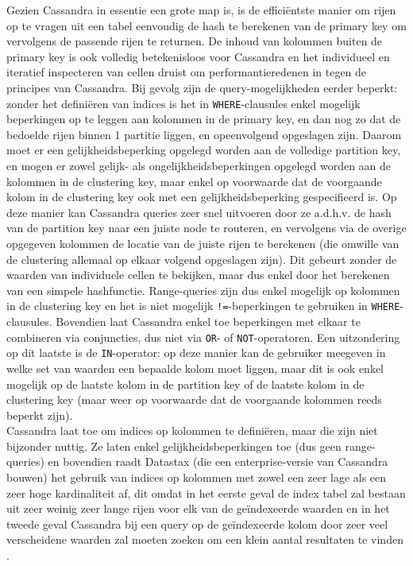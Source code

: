 Gezien Cassandra in essentie een grote map is, is de effici\"entste manier om rijen op te vragen uit een tabel eenvoudig de hash te berekenen van de primary key om vervolgens de passende rijen te returnen. De inhoud van kolommen buiten de primary key is ook volledig betekenisloos voor Cassandra en het individueel en iteratief inspecteren van cellen druist om performantieredenen in tegen de principes van Cassandra. Bij gevolg zijn de query-mogelijkheden eerder beperkt: zonder het defini\"eren van indices is het in \texttt{WHERE}-clausules enkel mogelijk beperkingen op te leggen aan kolommen in de primary key, en dan nog zo dat de bedoelde rijen binnen 1 partitie liggen, en opeenvolgend opgeslagen zijn. Daarom moet er een gelijkheidsbeperking opgelegd worden aan de volledige partition key, en mogen er zowel gelijk- als ongelijkheidsbeperkingen opgelegd worden aan de kolommen in de clustering key, maar enkel op voorwaarde dat de voorgaande kolom in de clustering key ook met een gelijkheidsbeperking gespecifieerd is. Op deze manier kan Cassandra queries zeer snel uitvoeren door ze a.d.h.v. de hash van de partition key naar een juiste node te routeren, en vervolgens via de overige opgegeven kolommen de locatie van de juiste rijen te berekenen (die omwille van de clustering allemaal op elkaar volgend opgeslagen zijn). Dit gebeurt zonder de waarden van individuele cellen te bekijken, maar dus enkel door het berekenen van een simpele hashfunctie. Range-queries zijn dus enkel mogelijk op kolommen in de clustering key en het is niet mogelijk \texttt{!=}-beperkingen te gebruiken in \texttt{WHERE}-clausules. Bovendien laat Cassandra enkel toe beperkingen met elkaar te combineren via conjuncties, dus niet via \texttt{OR}- of \texttt{NOT}-operatoren. Een uitzondering op dit laatste is de \texttt{IN}-operator: op deze manier kan de gebruiker meegeven in welke set van waarden een bepaalde kolom moet liggen, maar dit is ook enkel mogelijk op de laatste kolom in de partition key of de laatste kolom in de clustering key (maar weer op voorwaarde dat de voorgaande kolommen reeds beperkt zijn).\\
Cassandra laat toe om indices op kolommen te defini\"eren, maar die zijn niet bijzonder nuttig. Ze laten enkel gelijkheidsbeperkingen toe (dus geen range-queries) en bovendien raadt Datastax (die een enterprise-versie van Cassandra bouwen) het gebruik van indices op kolommen met zowel een zeer lage als een zeer hoge kardinaliteit af, dit omdat in het eerste geval de index tabel zal bestaan uit zeer weinig zeer lange rijen voor elk van de ge\"indexeerde waarden en in het tweede geval Cassandra bij een query op de ge\"indexeerde kolom door zeer veel verscheidene waarden zal moeten zoeken om een klein aantal resultaten te vinden \cite{when_to_use_index}.

